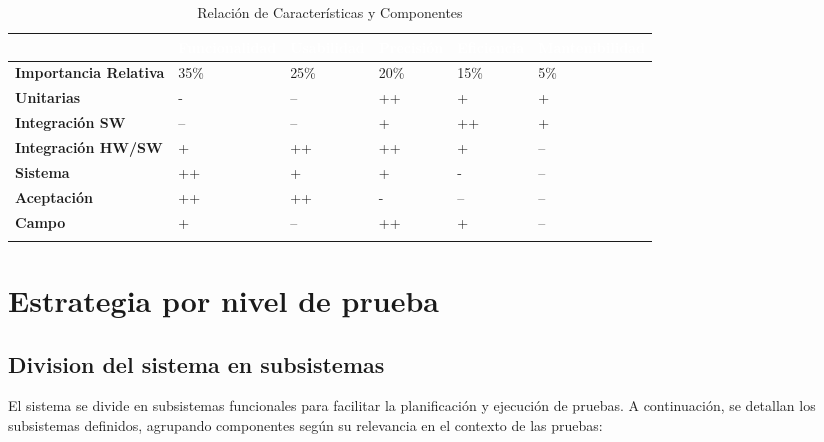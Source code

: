 \documentclass[12pt,a4paper, twosite]{article}
\begin{document}
\begin{longtable}{|p{3cm}|p{2cm}|p{2cm}|p{2cm}|p{2cm}|p{2cm}|}
  \hline
  \cellcolor[HTML]{4472C4}\textcolor{white}{\textbf{}} & \cellcolor[HTML]{4472C4}\textcolor{white}{\textbf{Funcionalidad}} & \cellcolor[HTML]{4472C4}\textcolor{white}{\textbf{Usabilidad}} & \cellcolor[HTML]{4472C4}\textcolor{white}{\textbf{Precisión}} & \cellcolor[HTML]{4472C4}\textcolor{white}{\textbf{Eficiencia}} & \cellcolor[HTML]{4472C4}\textcolor{white}{\textbf{Mantenibilidad}} \\ \hline
  \textbf{Importancia Relativa} & 35\% & 25\% & 20\% & 15\% & 5\% \\ \hline
  \textbf{Unitarias}           & -    & –    & ++   & +    & +    \\ \hline
  \textbf{Integración SW}      & –    & –    & +    & ++   & +    \\ \hline
  \textbf{Integración HW/SW}   & +    & ++   & ++   & +    & –    \\ \hline
  \textbf{Sistema}             & ++   & +    & +    & -    & –    \\ \hline
  \textbf{Aceptación}          & ++   & ++   & -    & –    & –    \\ \hline
  \textbf{Campo}               & +    & –    & ++   & +    & –    \\ \hline
  \caption{Relación de Características y Componentes} \label{tab:relacion_componentes} \\
\end{longtable}

\section{Estrategia por nivel de prueba}

\subsection{Division del sistema en subsistemas}

El sistema se divide en subsistemas funcionales para facilitar la planificación y ejecución de pruebas. A continuación, se detallan los subsistemas definidos, agrupando componentes según su relevancia en el contexto de las pruebas:
\end{document}
